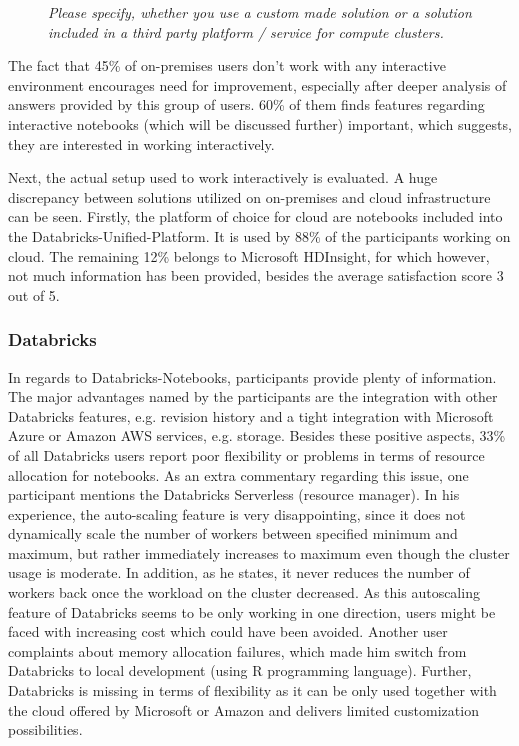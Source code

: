 \documentclass[a4paper,twoside]{article}
\begin{document}
\begin{figure}[!h]
  \centering
   {}
  \caption{\textit{Please specify, whether you use a custom made solution or a solution included in a third party platform / service for compute clusters.}}
  \label{fig:interactive_env}
\end{figure}

The fact that 45\% of on-premises users don’t work with any interactive environment encourages need for improvement, especially after deeper analysis of answers provided by
this group of users. 60\% of them finds features regarding interactive notebooks (which will be discussed further) important, which suggests, they are interested in working interactively.

Next, the actual setup used to work interactively is evaluated. A huge discrepancy between solutions utilized on on-premises and cloud infrastructure can be seen. Firstly, the platform of choice for cloud are notebooks included into the Databricks-Unified-Platform. It is used by 88\% of the participants working on cloud. The remaining 12\% belongs to Microsoft HDInsight, for which however, not much information has been provided, besides the average satisfaction score 3 out of 5. 

\subsubsection{Databricks}


In regards to Databricks-Notebooks, participants provide plenty of information. The major advantages named by the participants are the integration with other Databricks features, e.g. revision history and a tight integration with Microsoft Azure or Amazon AWS services, e.g. storage. Besides these positive aspects, 33\% of all Databricks users report poor flexibility or problems in terms of resource allocation for notebooks. As an extra commentary regarding this issue, one participant mentions the Databricks Serverless (resource manager). In his experience, the auto-scaling feature is very disappointing, since it does not dynamically scale the number of workers between specified minimum and maximum, but rather immediately increases to maximum even though the cluster usage is moderate. In addition, as he states, it never reduces the number of workers back once the workload on the cluster decreased. As this autoscaling feature of Databricks seems to be only working in one direction, users might be faced with increasing cost which could have been avoided. Another user complaints about memory allocation failures, which made him
switch from Databricks to local development (using R programming language). Further, Databricks is missing in terms of flexibility as it can be only used together with the cloud offered by Microsoft or Amazon and delivers limited customization possibilities. 
\end{document}
